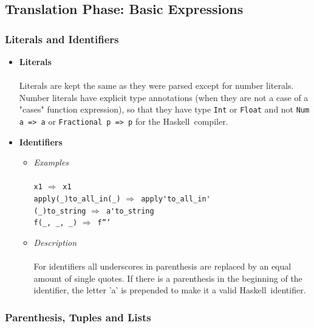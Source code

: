 \documentclass{article}
\def\H{Haskell}
\def\lra{$\Longrightarrow$\ }
\begin{document}
\subsection{Translation Phase: Basic Expressions}

\subsubsection{Literals and Identifiers}
\begin{itemize}
\item
\textbf{Literals}\\\\
Literals are kept the same as they were parsed except for number
literals. Number literals have explicit type annotations (when they are not a
case of a "cases" function expression), so that they have type \texttt{Int}
or \texttt{Float} and not \texttt{Num a => a} or \texttt{Fractional p => p}
for the \H\ compiler.

\item
\textbf{Identifiers}

\begin{itemize}
\item
\textit{Examples}\\\\
\texttt{x1} \lra \texttt{x1} \\
\verb|apply(_)to_all_in(_)| \lra \verb|apply'to_all_in'| \\
\verb|(_)to_string| \lra \verb|a'to_string| \\
\verb|f(_, _, _)| \lra \texttt{f'''}\\

\item
\textit{Description}\\\\
For identifiers all underscores in parenthesis are replaced by an equal amount
of single quotes. If there is a parenthesis in the beginning of the identifier,
the letter 'a' is prepended to make it a valid \H\ identifier.

\end{itemize}

\end{itemize}

\subsubsection{Parenthesis, Tuples and Lists}
\label{subsubsec:parentuplist}
\end{document}
